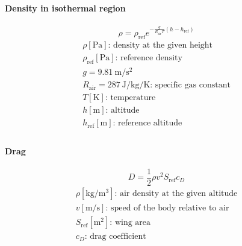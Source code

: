 \documentclass[10pt, twocolumn]{article}
\begin{document}
\paragraph{Density in isothermal region}
\[
  \rho = \rho_\mathrm{ref} e^{-\frac{g}{R_\mathrm{air}T} \left( h - h_\mathrm{ref} \right)}
\]
\[
  \begin{array}{|l}
    \rho [\si{\pascal}] \text{: density at the given height}                                                              \\
    \rho_\mathrm{ref} [\si{\pascal}] \text{: reference density}                                                           \\
    g = \SI{9.81}{\metre\per\second\squared}                                                                              \\
    R_\mathrm{air} = \SI[scientific-notation = false]{287}{\joule\per\kilogram\per\kelvin} \text{: specific gas constant} \\
    T [\si{\kelvin}] \text{: temperature}                                                                                 \\
    h [\si{\metre}] \text{: altitude}                                                                                     \\
    h_\mathrm{ref} [\si{\metre}] \text{: reference altitude}                                                              \\
  \end{array}
\]

\paragraph{Drag}
\[
  D = \frac{1}{2} \rho v^2 S_\mathrm{ref} c_D
\]
\[
  \begin{array}{|l}
    \rho [\si{\kilogram\per\metre\cubed}] \text{: air density at the given altitude} \\
    v [\si{\metre\per\second}] \text{: speed of the body relative to air}            \\
    S_\mathrm{ref} [\si{\metre\squared}] \text{: wing area}                          \\
    c_D \text{: drag coefficient}
  \end{array}
\]
\end{document}

